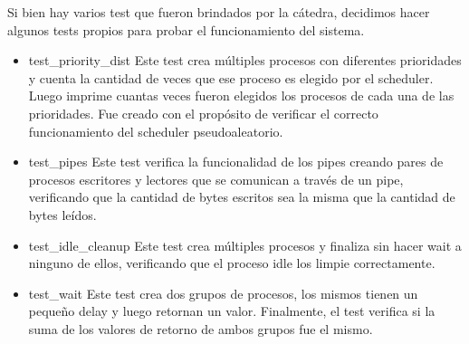 \documentclass{article}
\begin{document}
Si bien hay varios test que fueron brindados por la cátedra, decidimos hacer algunos tests propios para probar el funcionamiento del sistema. 
\begin{itemize}
    \item test\_priority\_dist\: Este test crea múltiples procesos con diferentes prioridades y cuenta la cantidad de veces que ese proceso es elegido por el scheduler. Luego imprime cuantas veces fueron elegidos los procesos de cada una de las prioridades. Fue creado con el propósito de verificar el correcto funcionamiento del scheduler pseudoaleatorio.
    \item test\_pipes\: Este test verifica la funcionalidad de los pipes creando pares de procesos escritores y lectores que se comunican a través de un pipe, verificando que la cantidad de bytes escritos sea la misma que la cantidad de bytes leídos.
    \item test\_idle\_cleanup\: Este test crea múltiples procesos y finaliza sin hacer wait a ninguno de ellos, verificando que el proceso idle los limpie correctamente.
    \item test\_wait\: Este test crea dos grupos de procesos, los mismos tienen un pequeño delay y luego retornan un valor. Finalmente, el test verifica si la suma de los valores de retorno de ambos grupos fue el mismo.
\end{itemize}
\end{document}

